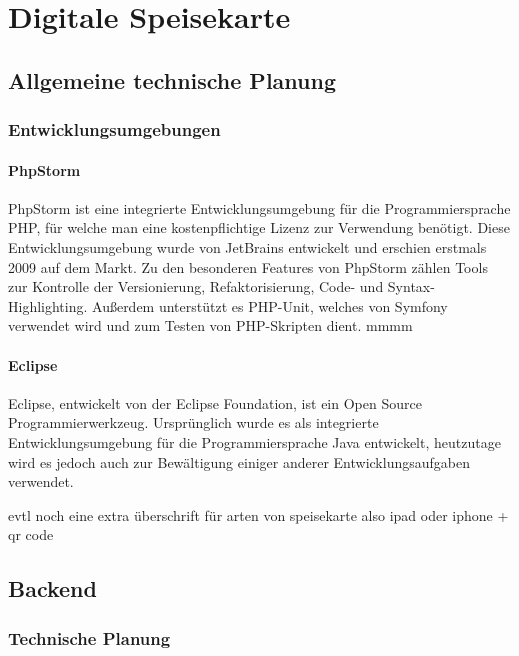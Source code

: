 \chapter{Digitale Speisekarte}
\renewcommand{\kapitelautor}{Autor: Katharina Joksch}

\section{Allgemeine technische Planung}

  \subsection{Entwicklungsumgebungen}

    \subsubsection{PhpStorm}
    
PhpStorm ist eine integrierte Entwicklungsumgebung für die Programmiersprache PHP, für welche man eine kostenpflichtige Lizenz zur Verwendung benötigt. Diese Entwicklungsumgebung wurde von JetBrains entwickelt und erschien erstmals 2009 auf dem Markt. Zu den besonderen Features von PhpStorm zählen Tools zur Kontrolle der Versionierung, Refaktorisierung, Code- und Syntax-Highlighting. Außerdem unterstützt es PHP-Unit, welches von Symfony verwendet wird und zum Testen von PHP-Skripten dient. 
mmmm
    \subsubsection{Eclipse}
    
Eclipse, entwickelt von der Eclipse Foundation, ist ein Open Source Programmierwerkzeug. Ursprünglich wurde es als integrierte Entwicklungsumgebung für die Programmiersprache Java entwickelt, heutzutage wird es jedoch auch zur Bewältigung einiger anderer Entwicklungsaufgaben verwendet.

evtl noch eine extra überschrift für arten von speisekarte also ipad oder iphone + qr code

\section{Backend}

  \subsection{Technische Planung}

